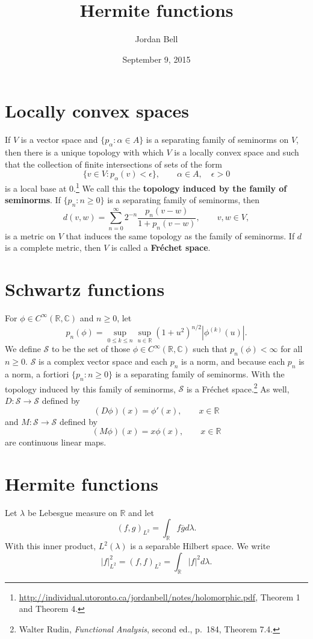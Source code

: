 \documentclass{article}
\theoremstyle{definition}
\theoremstyle{definition}
\begin{document}
\title{Hermite functions}
\author{Jordan Bell}
\date{September 9, 2015}

\maketitle


\section{Locally convex spaces}
If $V$ is a vector space and $\{p_\alpha: \alpha \in A\}$ is a separating family of seminorms on $V$,
then there is a unique  topology
with which $V$  is a locally convex space and such that the collection of
finite intersections of  sets of the form
\[
\{v \in V: p_\alpha(v)<\epsilon\},\qquad \alpha \in A,\quad \epsilon>0
\]
is a local base at $0$.\footnote{\url{http://individual.utoronto.ca/jordanbell/notes/holomorphic.pdf},
Theorem 1 and Theorem 4.}  We call this the \textbf{topology induced by the family of seminorms}.
If $\{p_n: n \geq 0\}$ is a separating family of seminorms, then 
\[
d(v,w) = \sum_{n=0}^\infty 2^{-n} \frac{p_n(v-w)}{1+p_n(v-w)}, \qquad v,w \in V,
\]
is a metric on $V$ that induces the same topology as the family of seminorms. 
If $d$ is a complete metric, then $V$ is called a \textbf{Fr\'echet space}. 




\section{Schwartz functions}
For $\phi \in C^\infty(\mathbb{R},\mathbb{C})$ and $n \geq 0$,
let 
\[
p_n(\phi) =\sup_{0 \leq k \leq n} \sup_{u \in \mathbb{R}} (1+u^2)^{n/2} |\phi^{(k)}(u)|.
\]
We define $\mathscr{S}$ to be the set of those 
$\phi \in C^\infty(\mathbb{R},\mathbb{C})$ such that $p_n(\phi)<\infty$ for all $n \geq 0$. 
$\mathscr{S}$ is a complex vector space 
and each $p_n$ is a norm, and
because each $p_n$ is a norm, a fortiori $\{p_n:  n \geq 0\}$ is a separating family of seminorms.
With the topology induced by this family of seminorms, $\mathscr{S}$ is a Fr\'echet space.\footnote{Walter
Rudin, {\em Functional Analysis}, second ed., p.~184, Theorem 7.4.}
As well, $D:\mathscr{S} \to \mathscr{S}$ defined by
\[
(D\phi)(x) = \phi'(x),\qquad x \in \mathbb{R}
\]
and
$M:\mathscr{S} \to \mathscr{S}$ defined by
\[
(M\phi)(x) = x \phi(x),\qquad x \in \mathbb{R}
\]
are continuous linear maps.


\section{Hermite functions}
Let $\lambda$ be Lebesgue measure on $\mathbb{R}$ and let
\[
(f,g)_{L^2} = \int_{\mathbb{R}} f\overline{g} d\lambda.
\]
With this inner product, $L^2(\lambda)$ is a  separable Hilbert space. We write
\[
|f|_{L^2}^2 = (f,f)_{L^2} = \int_{\mathbb{R}} |f|^2 d\lambda.
\]
\end{document}
